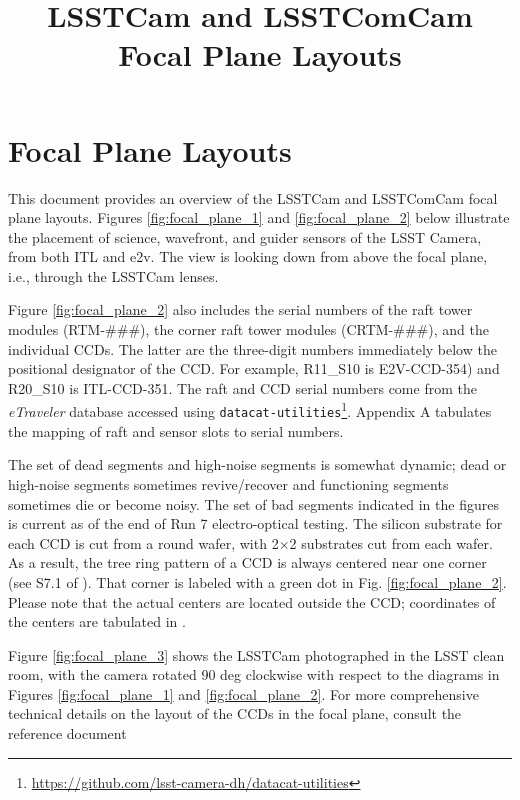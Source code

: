 \documentclass[CTN,authoryear,toc]{lsstdoc}
\title{LSSTCam and LSSTComCam Focal Plane Layouts}
\date{\vcsDate}
\begin{document}
\maketitle


\section{Focal Plane Layouts}
This document provides an overview of the LSSTCam \citep{10.71929/rubin/2571927} and LSSTComCam \citep{10.71929/rubin/2561361} focal plane layouts.
Figures \ref{fig:focal_plane_1} and \ref{fig:focal_plane_2} below illustrate the placement of science, wavefront, and guider sensors of the LSST Camera, from both ITL and e2v.
The view is looking down from above the focal plane, i.e., through the LSSTCam lenses.

Figure \ref{fig:focal_plane_2} also includes the serial numbers of the raft tower modules (RTM-\#\#\#), the corner raft tower modules (CRTM-\#\#\#), and the individual CCDs.
The latter are the three-digit numbers immediately below the positional designator of the CCD.
For example, R11\_S10 is E2V-CCD-354) and R20\_S10 is ITL-CCD-351.
The raft and CCD serial numbers come from the \emph{eTraveler} database accessed using {\tt{datacat-utilities}}\footnote{\url{https://github.com/lsst-camera-dh/datacat-utilities}}.
Appendix A tabulates the mapping of raft and sensor slots to serial numbers.

The set of dead segments and high-noise segments is somewhat dynamic; dead or high-noise segments sometimes revive/recover and functioning segments sometimes die or become noisy.
The set of bad segments indicated in the figures is current as of the end of Run 7 electro-optical testing.
The silicon substrate for each CCD is cut from a round wafer, with 2$\times$2 substrates cut from each wafer.
As a result, the tree ring pattern of a CCD is always centered near one corner (see S7.1 of ).
That corner is labeled with a green dot in Fig. \ref{fig:focal_plane_2}.
Please note that the actual centers are located outside the CCD; coordinates of the centers are tabulated in .

Figure \ref{fig:focal_plane_3} shows the LSSTCam photographed in the LSST clean room, with the camera rotated 90 deg clockwise with respect to the diagrams in Figures \ref{fig:focal_plane_1} and \ref{fig:focal_plane_2}.
For more comprehensive technical details on the layout of the CCDs in the focal plane, consult the reference document 
\end{document}
